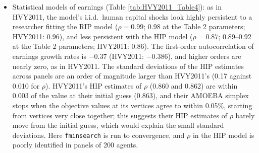 \documentclass[11pt,fleqn]{article}
\begin{document}
\begin{itemize}
 \item Statistical models of earnings (Table \ref{tab:HVY2011_Table4}): as in HVY2011, the model's i.i.d.\ human capital shocks look highly persistent to a researcher fitting the RIP model ($\rho=0.99$; 0.98 at the Table 2 parameters; HVY2011: 0.96), and less persistent with the HIP model ($\rho=0.87$; 0.89--0.92 at the Table 2 parameters; HVY2011: 0.86). The first-order autocorrelation of earnings growth rates is $-0.37$ (HVY2011: $-0.386$), and higher orders are nearly zero, as in HVY2011. The standard deviations of the HIP estimates across panels are an order of magnitude larger than HVY2011's (0.17 against 0.010 for $\rho$). HVY2011's HIP estimates of $\rho$ (0.860 and 0.862) are within 0.003 of the value at their initial guess (0.863), and their AMOEBA simplex stops when the objective values at its vertices agree to within 0.05\%, starting from vertices very close together; this suggests their HIP estimates of $\rho$ barely move from the initial guess, which would explain the small standard deviations. Here \verb|fminsearch| is run to convergence, and $\rho$ in the HIP model is poorly identified in panels of 200 agents.

\end{itemize}
\end{document}
